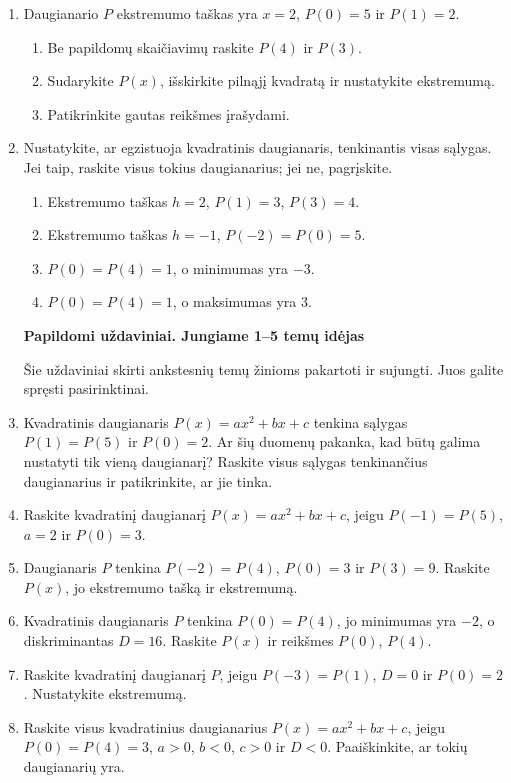 \documentclass[12pt,a4paper]{article}
\begin{document}
\begin{enumerate}
\begin{enumerate}
\item Išskirkite pilnąjį kvadratą, raskite ekstremumą ir patikrinkite $P(1)=P(5)$.
\end{enumerate}
\item Daugianario $P$ ekstremumo taškas yra $x=2$, $P(0)=5$ ir $P(1)=2$.
\begin{enumerate}
\item Be papildomų skaičiavimų raskite $P(4)$ ir $P(3)$.
\item Sudarykite $P(x)$, išskirkite pilnąjį kvadratą ir nustatykite ekstremumą.
\item Patikrinkite gautas reikšmes įrašydami.
\end{enumerate}
\item Nustatykite, ar egzistuoja kvadratinis daugianaris, tenkinantis visas sąlygas. Jei taip, raskite visus tokius daugianarius; jei ne, pagrįskite.
\begin{enumerate}
\item Ekstremumo taškas $h=2$, $P(1)=3$, $P(3)=4$.
\item Ekstremumo taškas $h=-1$, $P(-2)=P(0)=5$.
\item $P(0)=P(4)=1$, o minimumas yra $-3$.
\item $P(0)=P(4)=1$, o maksimumas yra $3$.
\end{enumerate}
\par\bigskip
\noindent\textbf{Papildomi uždaviniai. Jungiame 1–5 temų idėjas}\par
Šie uždaviniai skirti ankstesnių temų žinioms pakartoti ir sujungti. Juos galite spręsti pasirinktinai.
\item Kvadratinis daugianaris $P(x)=ax^2+bx+c$ tenkina sąlygas $P(1)=P(5)$ ir $P(0)=2$. Ar šių duomenų pakanka, kad būtų galima nustatyti tik vieną daugianarį? Raskite visus sąlygas tenkinančius daugianarius ir patikrinkite, ar jie tinka.
\item Raskite kvadratinį daugianarį $P(x)=ax^2+bx+c$, jeigu $P(-1)=P(5)$, $a=2$ ir $P(0)=3$.
\item Daugianaris $P$ tenkina $P(-2)=P(4)$, $P(0)=3$ ir $P(3)=9$. Raskite $P(x)$, jo ekstremumo tašką ir ekstremumą.
\item Kvadratinis daugianaris $P$ tenkina $P(0)=P(4)$, jo minimumas yra $-2$, o diskriminantas $D=16$. Raskite $P(x)$ ir reikšmes $P(0)$, $P(4)$.
\item Raskite kvadratinį daugianarį $P$, jeigu $P(-3)=P(1)$, $D=0$ ir $P(0)=2$. Nustatykite ekstremumą.
\item Raskite visus kvadratinius daugianarius $P(x)=ax^2+bx+c$, jeigu $P(0)=P(4)=3$, $a>0$, $b<0$, $c>0$ ir $D<0$. Paaiškinkite, ar tokių daugianarių yra.

\end{enumerate}
\end{document}
